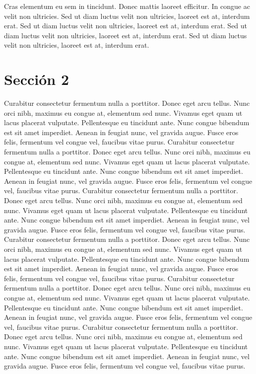 \documentclass[]{aleph-notas-test}
\begin{document}
Cras elementum eu sem in tincidunt. Donec mattis laoreet efficitur. In congue ac velit non ultricies. 
Sed ut diam luctus velit non ultricies, laoreet est at, interdum erat.  
Sed ut diam luctus velit non ultricies, laoreet est at, interdum erat.  
Sed ut diam luctus velit non ultricies, laoreet est at, interdum erat.  
Sed ut diam luctus velit non ultricies, laoreet est at, interdum erat.  

\section{Sección 2}

Curabitur consectetur fermentum nulla a porttitor. Donec eget arcu tellus. Nunc orci nibh, maximus eu congue at, elementum sed nunc. Vivamus eget quam ut lacus placerat vulputate. Pellentesque eu tincidunt ante. Nunc congue bibendum est sit amet imperdiet. Aenean in feugiat nunc, vel gravida augue. Fusce eros felis, fermentum vel congue vel, faucibus vitae purus.
Curabitur consectetur fermentum nulla a porttitor. Donec eget arcu tellus. Nunc orci nibh, maximus eu congue at, elementum sed nunc. Vivamus eget quam ut lacus placerat vulputate. Pellentesque eu tincidunt ante. Nunc congue bibendum est sit amet imperdiet. Aenean in feugiat nunc, vel gravida augue. Fusce eros felis, fermentum vel congue vel, faucibus vitae purus.
Curabitur consectetur fermentum nulla a porttitor. Donec eget arcu tellus. Nunc orci nibh, maximus eu congue at, elementum sed nunc. Vivamus eget quam ut lacus placerat vulputate. Pellentesque eu tincidunt ante. Nunc congue bibendum est sit amet imperdiet. Aenean in feugiat nunc, vel gravida augue. Fusce eros felis, fermentum vel congue vel, faucibus vitae purus.
Curabitur consectetur fermentum nulla a porttitor. Donec eget arcu tellus. Nunc orci nibh, maximus eu congue at, elementum sed nunc. Vivamus eget quam ut lacus placerat vulputate. Pellentesque eu tincidunt ante. Nunc congue bibendum est sit amet imperdiet. Aenean in feugiat nunc, vel gravida augue. Fusce eros felis, fermentum vel congue vel, faucibus vitae purus.
Curabitur consectetur fermentum nulla a porttitor. Donec eget arcu tellus. Nunc orci nibh, maximus eu congue at, elementum sed nunc. Vivamus eget quam ut lacus placerat vulputate. Pellentesque eu tincidunt ante. Nunc congue bibendum est sit amet imperdiet. Aenean in feugiat nunc, vel gravida augue. Fusce eros felis, fermentum vel congue vel, faucibus vitae purus.
Curabitur consectetur fermentum nulla a porttitor. Donec eget arcu tellus. Nunc orci nibh, maximus eu congue at, elementum sed nunc. Vivamus eget quam ut lacus placerat vulputate. Pellentesque eu tincidunt ante. Nunc congue bibendum est sit amet imperdiet. Aenean in feugiat nunc, vel gravida augue. Fusce eros felis, fermentum vel congue vel, faucibus vitae purus.
\end{document}
